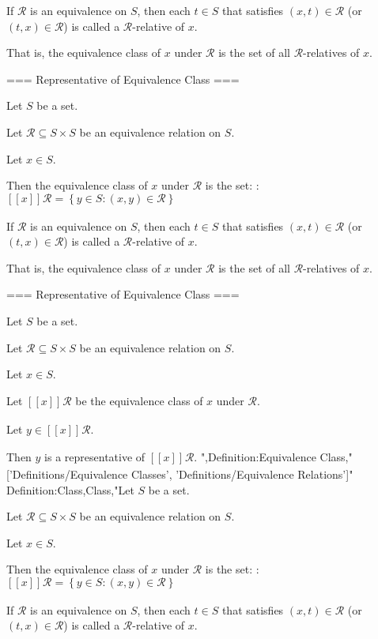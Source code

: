 If $\mathcal R$ is an equivalence on $S$, then each $t \in S$ that satisfies $\left( x, t \right) \in \mathcal R$ (or $\left( t, x \right) \in \mathcal R$) is called a $\mathcal R$-relative of $x$.


That is, the equivalence class of $x$ under $\mathcal R$ is the set of all $\mathcal R$-relatives of $x$.


=== Representative of Equivalence Class ===

Let $S$ be a set.

Let $\mathcal R \subseteq S \times S$ be an equivalence relation on $S$.

Let $x \in S$.


Then the equivalence class of $x$ under $\mathcal R$ is the set:
:$\left[\!\left[ x \right]\!\right]_{ }\mathcal R = \left\lbrace y \in S: \left( x, y \right) \in \mathcal R \right\rbrace$


If $\mathcal R$ is an equivalence on $S$, then each $t \in S$ that satisfies $\left( x, t \right) \in \mathcal R$ (or $\left( t, x \right) \in \mathcal R$) is called a $\mathcal R$-relative of $x$.


That is, the equivalence class of $x$ under $\mathcal R$ is the set of all $\mathcal R$-relatives of $x$.


=== Representative of Equivalence Class ===

Let $S$ be a set.

Let $\mathcal R \subseteq S \times S$ be an equivalence relation on $S$.

Let $x \in S$.


Let $\left[\!\left[ x \right]\!\right]_{ }\mathcal R$ be the equivalence class of $x$ under $\mathcal R$.

Let $y \in \left[\!\left[ x \right]\!\right]_{ }\mathcal R$.

Then $y$ is a representative of $\left[\!\left[ x \right]\!\right]_{ }\mathcal R$.
",Definition:Equivalence Class,"['Definitions/Equivalence Classes', 'Definitions/Equivalence Relations']"
Definition:Class,Class,"Let $S$ be a set.

Let $\mathcal R \subseteq S \times S$ be an equivalence relation on $S$.

Let $x \in S$.


Then the equivalence class of $x$ under $\mathcal R$ is the set:
:$\left[\!\left[ x \right]\!\right]_{ }\mathcal R = \left\lbrace y \in S: \left( x, y \right) \in \mathcal R \right\rbrace$


If $\mathcal R$ is an equivalence on $S$, then each $t \in S$ that satisfies $\left( x, t \right) \in \mathcal R$ (or $\left( t, x \right) \in \mathcal R$) is called a $\mathcal R$-relative of $x$.


